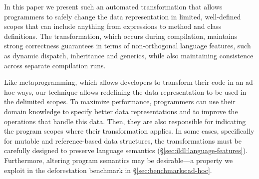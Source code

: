 In this paper we present such an automated transformation that allows programmers to safely change the data representation in limited, well-defined scopes that can include anything from expressions to method and class definitions. The transformation, which occurs during compilation, maintains strong correctness guarantees in terms of non-orthogonal language features, such as dynamic dispatch, inheritance and generics, while also maintaining consistence across separate compilation runs.

Like metaprogramming, which allows developers to transform their code
in an ad-hoc ways, our technique allows redefining the data
representation to be used in the delimited scopes. To maximize
performance, programmers can use their domain knowledge to specify
better data representations and to improve the operations that handle
this data. Then, they are also responsible for indicating the program
scopes where their transformation applies. In some cases, specifically
for mutable and reference-based data structures, the transformations
must be carefully designed to preserve language semantics
(\S\ref{sec:ildl:language-features}). Furthermore, altering program
semantics may be desirable---a property we exploit in the
deforestation benchmark in \S\ref{sec:benchmarks:ad-hoc}.

